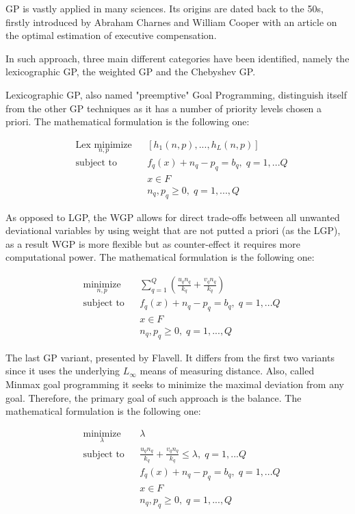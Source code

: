 \begin{doublespace}
GP is vastly applied in many sciences\cite{Tamiz1998}. Its origins are dated back to the 50s, firstly introduced by Abraham Charnes and William Cooper\cite{Charnes1955} with an article on the optimal estimation of executive compensation.

In such approach, three main different categories have been identified, namely the lexicographic GP, the weighted GP and the Chebyshev GP.

Lexicographic GP, also named "preemptive" Goal Programming, distinguish itself from the other GP techniques as it has a number of priority levels chosen a priori. The mathematical formulation is the following one:

\begin{equation*}
\begin{aligned}
& \underset{n,p}{\text{Lex minimize}}
& & [h_1(n,p),...,h_L(n,p)] \\
& \text{subject to}
& & f_q(x)+n_q-p_q=b_q, \; q=1,...Q \\
& & & x\in F \\
& & & n_q,p_q\geq 0, \; q=1,...,Q 
\end{aligned}
\end{equation*}

As opposed to LGP, the WGP allows for direct trade-offs between all unwanted deviational variables by using weight that are not putted a priori (as the LGP), as a result WGP is more flexible but as counter-effect it requires more computational power. The mathematical formulation is the following one:

\begin{equation*}
\begin{aligned}
& \underset{n,p}{\text{minimize}}
& & \sum_{q=1}^{Q}(\frac{u_q n_q}{k_q}+\frac{v_q n_q}{k_q}) \\
& \text{subject to}
& & f_q(x)+n_q-p_q=b_q, \; q=1,...Q \\
& & & x\in F \\
& & & n_q,p_q\geq 0, \; q=1,...,Q 
\end{aligned}
\end{equation*}

The last GP variant, presented by Flavell. It differs from the first two variants since it uses the underlying $ L_\infty $ means of measuring distance. Also, called Minmax goal programming it seeks to minimize the maximal deviation from any goal. Therefore, the primary goal of such approach is the balance. The mathematical formulation is the following one:

\begin{equation*}
\begin{aligned}
& \underset{\lambda}{\text{minimize}}
& & \lambda \\
& \text{subject to}
& & \frac{u_q n_q}{k_q}+\frac{v_q n_q}{k_q}\leq\lambda, \; q=1,...Q \\
& & & f_q(x)+n_q-p_q=b_q, \; q=1,...Q \\
& & & x\in F \\
& & & n_q,p_q\geq 0, \; q=1,...,Q 
\end{aligned}
\end{equation*}

\end{doublespace}
\clearpage{\pagestyle{empty}\cleardoublepage}
